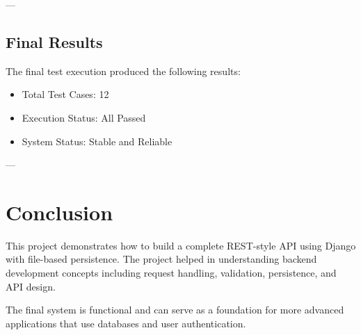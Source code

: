 \documentclass[12pt]{article}
\begin{document}
---

\subsection{Final Results}
The final test execution produced the following results:
\begin{itemize}
    \item Total Test Cases: 12
    \item Execution Status: All Passed
    \item System Status: Stable and Reliable
\end{itemize}

---


\section{Conclusion}

This project demonstrates how to build a complete REST-style API using Django 
with file-based persistence. The project helped in understanding backend 
development concepts including request handling, validation, persistence, 
and API design.

The final system is functional and can serve as a foundation for more advanced 
applications that use databases and user authentication.
\end{document}
